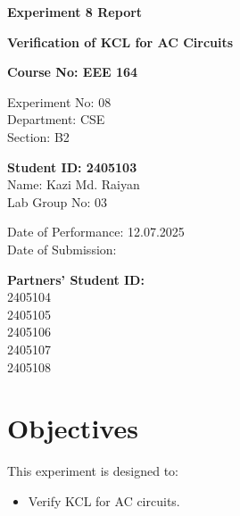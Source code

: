 \documentclass[12pt]{article}
\begin{document}
\begin{center}
	\begin{LARGE}
		\textbf{Experiment 8 Report}

		\vspace{20pt}
		\textbf{Verification of KCL for AC Circuits}
	\end{LARGE}
\end{center}

\begin{Large}
	\vspace{40pt}
	\textbf{Course No: EEE 164}
\end{Large}

\begin{large}
	\vspace{40pt}
	\begin{minipage}{0.48\textwidth}
		Experiment No: 08\\
		Department: CSE\\
		Section: B2
	\end{minipage}
	\hfill
	\begin{minipage}{0.48\textwidth}
		\textbf{Student ID: 2405103}\\
		Name: Kazi Md. Raiyan\\
		Lab Group No: 03
	\end{minipage}

	\vfill

	\begin{minipage}[t]{0.48\textwidth}
		Date of Performance: 12.07.2025\\
		Date of Submission: %
	\end{minipage}
	\hfill
	\begin{minipage}[t]{0.48\textwidth}
		\textbf{Partners' Student ID:}\\
		2405104\\
		2405105\\
		2405106\\
		2405107\\
		2405108
	\end{minipage}
	\vspace{80pt}

	\newpage
	\section{Objectives}
	This experiment is designed to:
	\begin{itemize}
		\item Verify KCL for AC circuits.
	\end{itemize}


\end{large}
\end{document}
